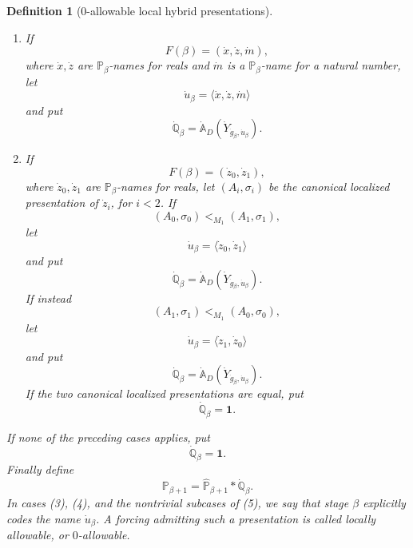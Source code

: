 \documentclass[a4paper,11pt]{article}
\newtheorem{definition}[theorem]{Definition}
\begin{document}
\begin{definition}[\(0\)-allowable local hybrid presentations]
\begin{enumerate}
   \item If
   \[
      F(\beta)=(\dot x,\dot z,\dot m),
   \]
   where \(\dot x,\dot z\) are \(\mathbb P_\beta\)-names for reals and
   \(\dot m\) is a \(\mathbb P_\beta\)-name for a natural number, let
   \[
      \dot u_\beta=\langle \dot x,\dot z,\dot m\rangle
   \]
   and put
   \[
      \dot{\mathbb Q}_\beta
      =
      \dot{\mathbb A}_D(\dot Y_{\dot g_\beta,\dot u_\beta}).
   \]

   \item If
   \[
      F(\beta)=(\dot z_0,\dot z_1),
   \]
   where \(\dot z_0,\dot z_1\) are \(\mathbb P_\beta\)-names for reals, let
   \((A_i,\sigma_i)\) be the canonical localized presentation of \(\dot z_i\),
   for \(i<2\).  If
   \[
      (A_0,\sigma_0)<_{M_1}(A_1,\sigma_1),
   \]
   let
   \[
      \dot u_\beta=\langle \dot z_0,\dot z_1\rangle
   \]
   and put
   \[
      \dot{\mathbb Q}_\beta
      =
      \dot{\mathbb A}_D(\dot Y_{\dot g_\beta,\dot u_\beta}).
   \]
   If instead
   \[
      (A_1,\sigma_1)<_{M_1}(A_0,\sigma_0),
   \]
   let
   \[
      \dot u_\beta=\langle \dot z_1,\dot z_0\rangle
   \]
   and put
   \[
      \dot{\mathbb Q}_\beta
      =
      \dot{\mathbb A}_D(\dot Y_{\dot g_\beta,\dot u_\beta}).
   \]
   If the two canonical localized presentations are equal, put
   \[
      \dot{\mathbb Q}_\beta=\mathbf 1.
   \]
\end{enumerate}
If none of the preceding cases applies, put
\[
   \dot{\mathbb Q}_\beta=\mathbf 1.
\]
Finally define
\[
   \mathbb P_{\beta+1}
      =
   \widehat{\mathbb P}_{\beta+1}*\dot{\mathbb Q}_\beta.
\]
In cases (3), (4), and the nontrivial subcases of (5), we say that stage
\(\beta\) \emph{explicitly codes} the name \(\dot u_\beta\).  A forcing
admitting such a presentation is called \emph{locally allowable}, or
\emph{\(0\)-allowable}.
\end{definition}
\end{document}
